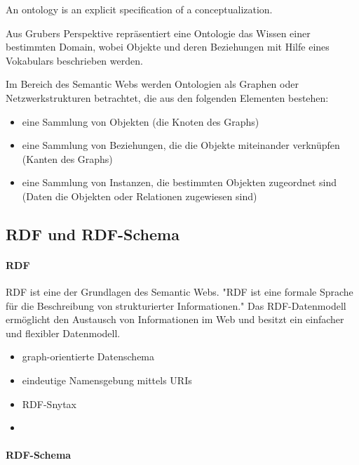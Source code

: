 \begin{definition}
  An ontology is an explicit specification of a conceptualization.
\end{definition}

\noindent Aus Grubers Perspektive repräsentiert eine Ontologie das Wissen einer bestimmten Domain, wobei Objekte und deren Beziehungen mit Hilfe eines Vokabulars beschrieben werden. \citep[vgl.]{breitman_semantic_2007}

Im Bereich des Semantic Webs werden Ontologien als Graphen oder Netzwerkstrukturen betrachtet, die aus den folgenden Elementen bestehen:

\begin{itemize}
	\item eine Sammlung von Objekten (die Knoten des Graphs)
	\item eine Sammlung von Beziehungen, die die Objekte miteinander verknüpfen (Kanten des Graphs)
	\item eine Sammlung von Instanzen, die bestimmten Objekten zugeordnet sind (Daten die Objekten oder Relationen zugewiesen sind) \citep[vgl.]{davies_semantic_2006}
\end{itemize}

\subsection{RDF und RDF-Schema} 

\paragraph{RDF}

\ac{RDF} ist eine der Grundlagen des Semantic Webs.
"\ac{RDF} ist eine formale Sprache für die Beschreibung von strukturierter Informationen." \citet{hitzler} 
Das RDF-Datenmodell ermöglicht den Austausch von Informationen im Web und besitzt ein einfacher und flexibler Datenmodell. \citep[vgl.]{linkeddatavisualization}

\begin{itemize}
	\item graph-orientierte Datenschema
	\item eindeutige Namensgebung mittels URIs
	\item RDF-Snytax
	\item 
\end{itemize}

\paragraph{RDF-Schema} 

